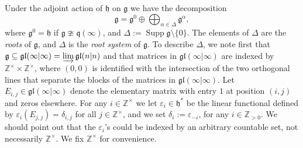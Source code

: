 \documentclass[12pt]{amsart}
\newcommand\Z{\mathbb{Z}}
\newcommand\g{\mathfrak{g}}
\newcommand\fq{\mathfrak{q}}
\newcommand\fh{\mathfrak{h}}
\newcommand\fgl{\mathfrak{gl}}
\newcommand\D{\Delta}
\DeclareMathOperator{\Supp}{Supp} %
\theoremstyle{plain}
\theoremstyle{definition}
\numberwithin{equation}{section}
\begin{document}
Under the adjoint action of $\fh$ on $\g$ we have the decomposition
	\[
\g = \g^0\oplus \bigoplus_{\alpha\in \D} \g^\alpha,
	\]
where $\g^0 = \fh$ if $\g\ncong \fq(\infty)$, and $\D := \Supp \g\setminus \{0\}$. The elements of $\D$ are the \emph{roots} of $\g$, and $\D$ is the \emph{root system} of $\g$.  To describe $\D$, we note first that $\g \subseteq \fgl(\infty | \infty) = \varinjlim \fgl(n|n)$ and that matrices in $\fgl(\infty | \infty)$ are indexed by $\Z^\times \times \Z^\times $, where $(0,0)$ is identified with the intersection of the two orthogonal lines that separate the blocks of the matrices in $\fgl(\infty | \infty)$. Let $E_{i,j}\in \fgl(\infty | \infty)$ denote the elementary matrix with entry $1$ at position $(i,j)$ and zeros elsewhere. For any $i\in \Z^\times $ we let $\varepsilon_i\in \fh^*$ be the linear functional defined by $\varepsilon_i(E_{j,j}) = \delta_{i, j}$ for all $j\in \Z^\times $, and we set $\delta_i:=\varepsilon_{-i}$, for any $i\in \Z_{>0}$. We should point out that the $\varepsilon_i$'s could be indexed by an arbitrary countable set, not necessarily $\Z^\times $. We fix $\Z^\times$ for convenience.
\end{document}
